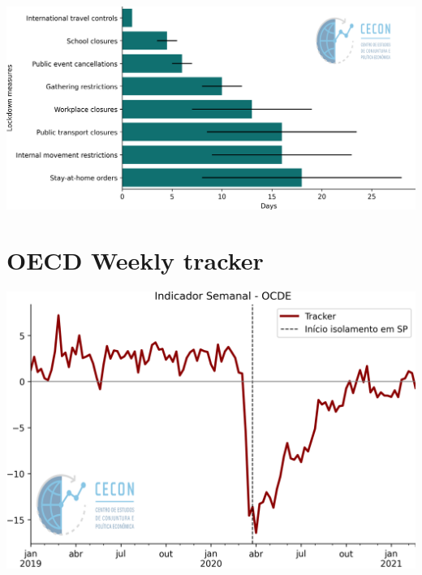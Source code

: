 \documentclass{SelfArx}
\begin{document}
\begin{center}
\includegraphics[width=.9\linewidth]{./figs/IMF/Lock_measures.png}
\end{center}

\section*{OECD Weekly tracker}
\label{sec:org4d4ce1f}

\begin{center}
\includegraphics[width=.9\linewidth]{./figs/Granulares/OCDE_Semanal.png}
\end{center}
\end{document}
